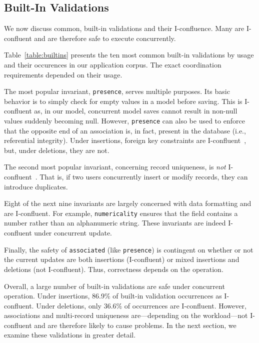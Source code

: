 \subsection{Built-In Validations}

We now discuss common, built-in validations and their
I-confluence. Many are I-confluent and are therefore safe to execute
concurrently.

Table~\ref{table:builtins} presents the ten most common built-in
validations by usage and their occurences in our application
corpus. The exact coordination requirements depended on their usage.

The most popular invariant, \texttt{presence}, serves multiple purposes. Its
basic behavior is to simply check for empty values in a model before
saving. This is I-confluent as, in our model, concurrent model saves
cannot result in non-null values suddenly becoming null. However,
\texttt{presence} can also be used to enforce that the opposite end of
an association is, in fact, present in the database (i.e., referential
integrity). Under insertions, foreign key constraints are
I-confluent~\cite{coord-avoid}, but, under deletions, they are not.

The second most popular invariant, concerning record uniqueness, is
\textit{not} I-confluent~\cite{coord-avoid}. That is, if two users
concurrently insert or modify records, they can introduce duplicates.

Eight of the next nine invariants are largely concerned with data
formatting and are I-confluent. For example, \texttt{numericality}
ensures that the field contains a number rather than an alphanumeric
string. These invariants are indeed I-confluent under concurrent
update.

Finally, the safety of \texttt{associated} (like \texttt{presence}) is
contingent on whether or not the current updates are both insertions
(I-confluent) or mixed insertions and deletions (not
I-confluent). Thus, correctness depends on the operation.

Overall, a large number of built-in validations are safe under
concurrent operation. Under insertions, 86.9\% of built-in validation
occurrences as I-confluent. Under deletions, only 36.6\% of
occurrences are I-confluent.  However, associations and multi-record
uniqueness are---depending on the workload---not I-confluent and are
therefore likely to cause problems. In the next section, we examine
these validations in greater detail.

